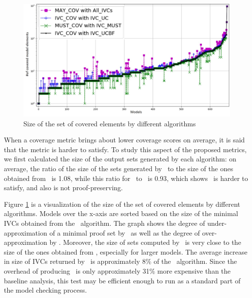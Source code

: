 \begin{figure}
  \centering
  \includegraphics[width=\columnwidth]{figs/cv_size.jpg}
  \caption{Size of the set of covered elements by different algorithms}\label{fig:cvsize}
\end{figure}

When a coverage metric brings about lower coverage scores on average,
it is said that the metric is harder to satisfy.
To study this aspect of the proposed metrics,
we first calculated the size of the output sets generated by each algorithm: on average, the ratio of the size of the sets generated by \ucalg\ to the size of the ones obtained from \ucbfalg\ is 1.08,
while this ratio for \mustalg\ to \ucbfalg\ is 0.93, which shows \mustalg\ is harder to satisfy, and also is not proof-preserving.

Figure \ref{fig:cvsize} is a visualization of the size of the set of covered elements by different algorithms. Models over the x-axis are sorted based on the size of the minimal IVCs obtained from the \ucbfalg\
algorithm.
The graph shows the degree of under-approximation of a minimal proof set by \mustalg\ as well as the degree of over-approximation by \ucalg.
Moreover, the size of sets computed by \ucalg\ is very close to the size
of the ones obtained from \ucbfalg, especially for larger models.  The average increase in size of IVCs returned by \ucalg\ is approximately 8\% of the \ucbfalg\ algorithm.  Since the overhead of producing \ucalg\ is only approximately 31\% more expensive than the baseline analysis, this test may be efficient enough to run as a standard part of the model checking process.  %



